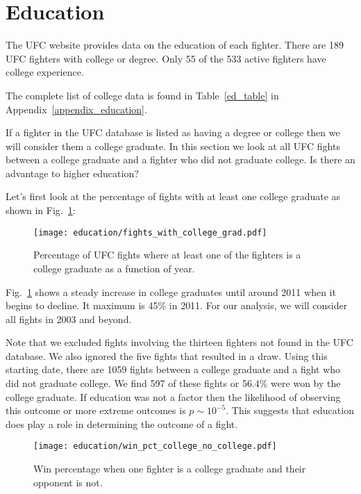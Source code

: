 \clearpage
\section*{Education}

The UFC website provides data on the education of each fighter.
There are 189 UFC fighters with college or degree. Only 55
of the 533 active fighters have college experience.

The complete list of college data is found in Table~\ref{ed_table}
in Appendix~\ref{appendix_education}.

If a fighter in the UFC database is listed as having a degree
or college then we will consider them a college graduate. In
this section we look at all UFC fights between a college graduate
and a fighter who did not graduate college. Is there an advantage
to higher education?

Let's first look at the percentage of fights with at least
one college graduate as shown in Fig.~\ref{fights_with_college_grad}:

\begin{figure}[h]
\begin{center}
\texttt{[image: education/fights\_with\_college\_grad.pdf]}
\caption{Percentage of UFC fights where at least one of the fighters
is a college graduate as a function of year.}
\label{fights_with_college_grad}
\end{center}
\end{figure}

Fig.~\ref{fights_with_college_grad} shows a steady increase in
college graduates until around 2011 when it begins to decline.
It maximum is 45\% in 2011. For our analysis, we will consider
all fights in 2003 and beyond.

Note that we excluded fights involving the thirteen fighters
not found in the UFC database. We also ignored the five fights that resulted
in a draw.
Using this starting date, there are 1059 fights between a college
graduate and a fight who did not graduate college. We find
597 of these fights or 56.4\% were won by the college graduate.
If education was not a factor then the likelihood of observing
this outcome or more extreme outcomes is $p\sim10^{-5}$. This
suggests that education does play a role in determining the outcome
of a fight.

\begin{figure}[h]
\begin{center}
\texttt{[image: education/win\_pct\_college\_no\_college.pdf]}
\caption{Win percentage when one fighter is a college graduate and their
opponent is not.}
\label{win_pct_college_no_college}
\end{center}
\end{figure}
